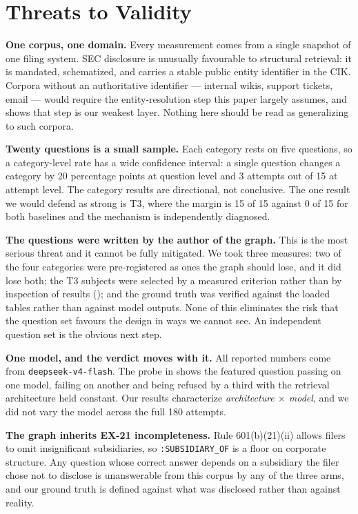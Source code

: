 \section{Threats to Validity}
\label{sec:threats}

\textbf{One corpus, one domain.} Every measurement comes from a single snapshot of
one filing system. SEC disclosure is unusually favourable to structural retrieval:
it is mandated, schematized, and carries a stable public entity identifier in the
CIK. Corpora without an authoritative identifier --- internal wikis, support
tickets, email --- would require the entity-resolution step this paper largely
assumes, and  shows that step is our weakest layer. Nothing
here should be read as generalizing to such corpora.

\textbf{Twenty questions is a small sample.} Each category rests on five
questions, so a category-level rate has a wide confidence interval: a single
question changes a category by 20 percentage points at question level and 3
attempts out of 15 at attempt level. The category results are directional, not
conclusive. The one result we would defend as strong is T3, where the margin is
15 of 15 against 0 of 15 for both baselines and the mechanism is independently
diagnosed.

\textbf{The questions were written by the author of the graph.} This is the most
serious threat and it cannot be fully mitigated. We took three measures: two of
the four categories were pre-registered as ones the graph should lose, and it did
lose both; the T3 subjects were selected by a measured criterion rather than by
inspection of results (); and the ground truth was verified
against the loaded tables rather than against model outputs. None of this
eliminates the risk that the question set favours the design in ways we cannot
see. An independent question set is the obvious next step.

\textbf{One model, and the verdict moves with it.} All reported numbers come from
\texttt{deepseek-v4-flash}. The probe in  shows the featured
question passing on one model, failing on another and being refused by a third
with the retrieval architecture held constant. Our results characterize
\emph{architecture $\times$ model}, and we did not vary the model across the full
180 attempts.

\textbf{The graph inherits EX-21 incompleteness.} Rule 601(b)(21)(ii) allows
filers to omit insignificant subsidiaries, so \texttt{:SUBSIDIARY\_OF} is a floor
on corporate structure. Any question whose correct answer depends on a subsidiary
the filer chose not to disclose is unanswerable from this corpus by any of the
three arms, and our ground truth is defined against what was disclosed rather than
against reality.

